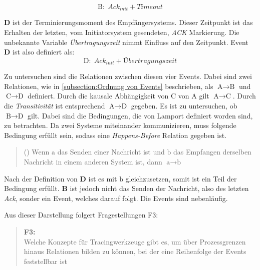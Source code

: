 \[
	\text{B}: \; Ack_{init} + Timeout  
\]

 \textbf{D} ist der Terminierungsmoment des Empfängersystems. Dieser Zeitpunkt ist das Erhalten der letzten, vom Initiatorsystem gesendeten, \emph{ACK} Markierung. Die unbekannte Variable \emph{Übertragungszeit} nimmt Einfluss auf den Zeitpunkt. Event \textbf{D} ist also definiert als:
 \[
 \text{D}: \; Ack_{init} + Übertragungszeit 
 \]
 
 Zu untersuchen sind die Relationen zwischen diesen vier Events.
 Dabei sind zwei Relationen, wie in \cref{subsection:Ordnung von Events} beschrieben, als $\text{A}\rightarrow\text{B}$ und $\text{C}\rightarrow\text{D}$ definiert. Durch die kausale Abhängigkeit von $\text{C}$ von $\text{A}$ gilt $\text{A}\rightarrow\text{C}$. Durch die \emph{Transitivität} ist entsprechend  $\text{A}\rightarrow\text{D}$ gegeben.  Es ist zu untersuchen, ob $\text{B}\rightarrow\text{D}$ gilt.
 Dabei sind die Bedingungen, die von Lamport definiert worden sind, zu betrachten. Da zwei Systeme miteinander kommunizieren, muss folgende Bedingung erfüllt sein, sodass eine \emph{Happens-Before} Relation gegeben ist. 
 \begin{quote}
	\cbstart
 	() Wenn $\text{a}$ das Senden einer Nachricht ist und $\text{b}$ das Empfangen derselben Nachricht in einem anderen System ist, dann $\text{a}\rightarrow\text{b}$
 	\cbend
 \end{quote}

Nach der Definition von \textbf{D} ist es mit $\text{b}$ gleichzusetzen, somit ist ein Teil der Bedingung erfüllt. \textbf{B} ist jedoch nicht das Senden der Nachricht, also des letzten \emph{Ack}, sonder ein Event, welches darauf folgt. Die Events sind nebenläufig. 


Aus dieser Darstellung folgert Fragestellungen F3:
\begin{quote}
	\cbstart
	\textbf{F3:} \\
	Welche Konzepte für Tracingwerkzeuge gibt es, um über Prozessgrenzen hinaus Relationen bilden zu können, bei der eine Reihenfolge der Events feststellbar ist
	\cbend
\end{quote}

